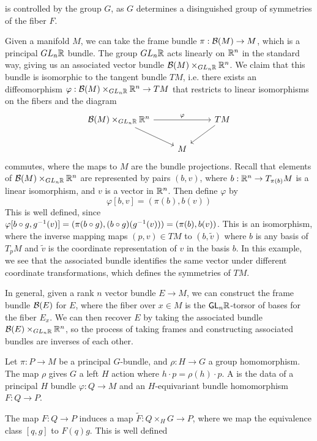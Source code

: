 is controlled by the group $G$, as $G$ determines a disinguished
group of symmetries of the fiber $F$.
%
\begin{exmp}
Given a manifold $M$, we can take the frame bundle $\pi : \mathcal{B}(M) \to M$, which is a
principal $GL_n\mathbb{R}$ bundle. The group $GL_n\mathbb{R}$ acts linearly on $\mathbb{R}^n$ in the
standard way, giving us an associated vector bundle $\mathcal{B}(M) \times_{GL_n\mathbb{R}} \mathbb{R}^n$.
We claim that this bundle is isomorphic to the tangent bundle $TM$, i.e. there
exists an diffeomorphism $\varphi : \mathcal{B}(M) \times_{GL_n\mathbb{R}} \mathbb{R}^n \to TM$ that
restricts to linear isomorphisms on the fibers and the diagram
\[\begin{tikzcd}
\B(M) \times_{GL_n\R} \R^n \ar[rr, "\varphi"] \ar[dr] && TM \ar[dl] \\
& M
\end{tikzcd}\]
commutes, where the maps to $M$ are the bundle projections. Recall that
elements of $\mathcal{B}(M) \times_{GL_n\mathbb{R}} \mathbb{R}^n$ are represented by pairs $(b, v)$,
where $b: \mathbb{R}^n \to T_{\pi(b)}M$ is a linear isomorphism, and $v$ is a vector in $\mathbb{R}^n$.
Then define $\varphi$ by
\[
\varphi[b,v] = (\pi(b), b(v))
\]
This is well defined, since $\varphi[b\circ g, g^{-1}(v)] = (\pi(b \circ g),
(b\circ g)(g^{-1}(v))) = (\pi(b), b(v))$. This is an isomorphism, where the
inverse mapping maps $(p,v) \in TM$ to $(b, \tilde{v})$ where $b$ is any
basis of $T_pM$ and $\tilde{v}$ is the coordinate representation of $v$ in the
basis $b$. In this example, we see that the associated bundle identifies the same vector
under different coordinate transformations, which defines the symmetries of
$TM$.
\end{exmp}
%
In general, given a rank $n$ vector bundle $E \to M$, we can construct the
frame bundle  $\mathcal{B}(E)$ for $E$, where the fiber over $x \in M$ is the
$\mathsf{GL}_n\mathbb{R}$-torsor of bases for the fiber $E_x$. We can then
recover $E$ by taking the associated bundle
$\mathcal{B}(E) \times_{GL_n\mathbb{R}} \mathbb{R}^n$, so the process of taking frames and constructing
associated bundles are inverses of each other.
%
\begin{defn}
Let $\pi : P \to M$ be a principal $G$-bundle, and $\rho : H \to G$ a group
homomorphism. The map $\rho$ gives $G$ a left $H$ action where
$h \cdot p = \rho(h) \cdot p$. A  is the
data of a principal $H$ bundle $\varphi : Q \to M$ and an $H$-equivariant bundle
homomorphism $F : Q \to P$.
\end{defn}
%
The map $F : Q \to P$ induces a map $\tilde{F} : Q \times_H G \to P$, where we
map the equivalence class $[q,g]$ to $F(q) g$. This is well defined
